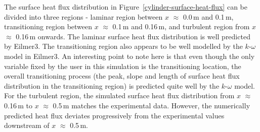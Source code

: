 The surface heat flux distribution in Figure~\ref{cylinder-surface-heat-flux}
can be divided into three regions - laminar region between $x$ $\approx$ 0.0\,m 
and 0.1\,m, transitioning region between $x$ $\approx$ 0.1\,m and 0.16\,m, and
turbulent region from $x$ $\approx$ 0.16\,m onwards. The laminar surface heat 
flux distribution is well predicted by Eilmer3. The transitioning region also
appears to be well modelled by the $k$-$\omega$ model in Eilmer3. An interesting 
point to note here is that even though the only variable fixed by the user in 
this simulation is the transitioning location, the overall transitioning process 
(the peak, slope and length of surface heat flux distribution in the transitioning 
region) is predicted quite well by the $k$-$\omega$ model. For the turbulent
region, the simulated surface heat flux distribution from $x$ $\approx$ 0.16\,m to
$x$ $\approx$ 0.5\,m matches the experimental data. However, the numerically 
predicted heat flux deviates progressively from the experimental values downstream 
of $x$ $\approx$ 0.5\,m.
%
